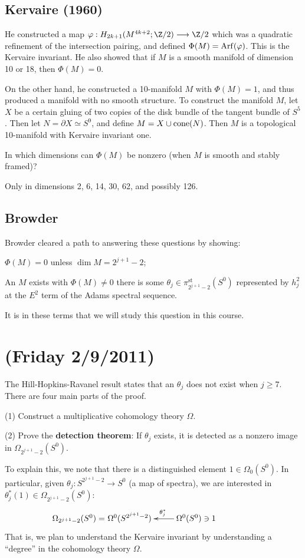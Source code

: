 \documentclass[11pt]{article}
\newcommand{\NewLecture}[3]{\section{#1 {\small(#2/#3/2011)}}}
\begin{document}
\begin{FirstWeek}
\subsection*{Kervaire (1960)}He constructed a map
$\phi:H_{2k+1}(M^{4k+2};\Z/2)\to\Z/2$ which was a quadratic refinement of the
intersection pairing, and defined $\Phi(M)=\operatorname{Arf}(\varphi)$. This is the
Kervaire invariant. He also showed that if $M$ is a smooth manifold of dimension
10 or 18, then $\Phi(M)=0$.

On the other hand, he constructed a 10-manifold $M$ with $\Phi(M)=1$, and thus
produced a manifold with no smooth structure. To construct the manifold $M$, let
$X$ be a certain gluing of two copies of the disk bundle of the tangent bundle
of $S^5$. Then let $N=\partial X\simeq S^9$, and define $M=X\cup\operatorname{cone}(N)$. Then
$M$ is a topological 10-manifold with Kervaire invariant one.
\begin{question}
In which dimensions can $\Phi(M)$ be nonzero (when $M$ is smooth and stably
framed)?
\end{question}
\begin{answer}
Only in dimensions 2, 6, 14, 30, 62, and possibly 126. 
\end{answer}
\subsection*{Browder}
Browder cleared a path to answering these questions by showing:
\begin{itemise}
\item $\Phi(M)=0$ unless $\dim M=2^{j+1}-2$;
\item An $M$ exists with $\Phi(M)\neq0$ \Iff there is some
$\theta_j\in\pi_{2^{j+1}-2}^\text{st}(S^0)$ represented by $h_j^2$ at the $E^2$
term of the Adams spectral sequence.
\end{itemise}
It is in these terms that we will study this question in this course.
\NewLecture{}{Friday 2}{9}
The Hill-Hopkins-Ravanel result states that an $\theta_j$ does not exist when $j\geq7$. There are
four main parts of the proof.
\begin{itemise}
\item[(1)] Construct a multiplicative cohomology theory $\Omega$.
\item[(2)] Prove the \textbf{detection theorem}: If $\theta_j$ exists, it is
detected as a nonzero image in $\Omega_{2^{j+1}-2}(S^0)$.

\INDENT To explain this, we note that there is a distinguished element
$1\in\Omega_0(S^0)$. In particular, given $\theta_j:S^{2^{j+1}-2}\to S^0$ (a map
of spectra), we are interested in $\theta_j^*(1)\in\Omega_{2^{j+1}-2}(S^0)$:
\[\qquad\xymatrix{
\makebox[0cm][r]{$\Omega_{2^{j+1}-2}(S^0)=$\ }\Omega^0(S^{2^{j+1}-2})&
\ar[l]_{\theta_j^*}\Omega^0(S^{0})\ni 1
}\]
That is, we plan to understand the Kervaire invariant by understanding a
``degree'' in the cohomology theory $\Omega$.


\end{itemise}
\end{FirstWeek}
\end{document}
